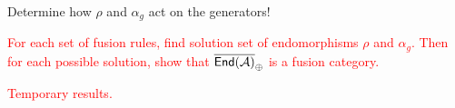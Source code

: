 \newpage

\noindent Determine how $\rho$ and $\alpha_g$ act on the generators!\\

\newpage


\newpage

\noindent 

\noindent\textcolor{red}{For each set of fusion rules, find solution set of endomorphisms $\rho$ and $\alpha_g$. Then for each possible solution, show that $\overline{\textup{\textsf{End}}(\mathcal{A})}_\oplus$ is a fusion category.}
\newpage

\noindent\textcolor{red}{Temporary results.}\\

